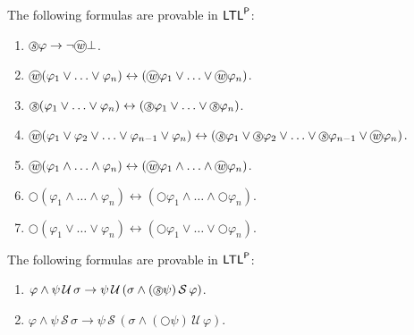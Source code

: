 \documentclass[envcountsect,envcountsame,oribibl,orivec]{llncs}
\newcommand*\circled[1]{\tikz[baseline=(char.base)]{
		\node[shape=circle,draw,inner sep=0.4pt] (char) {#1};}}
\newcommand{\limplies}{\rightarrow}
\newcommand{\lnext}{\bigcirc}
\newcommand{\luntil}{{\,\mathcal{U}\,}}
\newcommand{\lsince}{{\,\mathcal{S}\,}}
\newcommand{\wprevious}{\circled{\textit{w}}}
\newcommand{\sprevious}{\circled{\textit{s}}}
\newcommand{\LTL}{\textsf{LTL}}
\newcommand{\LTLp}{\LTL^{\sf P}}
\renewcommand{\phi}{\varphi}
\begin{document}
\begin{lemma}\label{lem: properties of previous operators}
	The following formulas are provable in $\LTLp$:
	\begin{enumerate}
		\item $\sprevious \phi \rightarrow \neg \wprevious \bot$.
		
		\item $\wprevious(\phi_1 \vee \ldots \vee \phi_n) \leftrightarrow (\wprevious \phi_1 \vee \ldots \vee \wprevious \phi_n)$.
		
		\item $\sprevious(\phi_1 \vee \ldots \vee \phi_n) \leftrightarrow (\sprevious \phi_1 \vee \ldots \vee \sprevious \phi_n)$.
		
		\item $\wprevious(\phi_1 \vee \phi_2 \vee \ldots \vee \phi_{n-1} \vee \phi_n) \leftrightarrow (\sprevious \phi_1 \vee \sprevious \phi_2 \vee\ldots \vee \sprevious \phi_{n-1} \vee \wprevious \phi_n)$.
		
		\item $\wprevious (\phi_1 \wedge \ldots \wedge \phi_n) \leftrightarrow (\wprevious \phi_1 \wedge \ldots \wedge \wprevious \phi_n)$.
		
		\item $\lnext (\phi_1 \wedge \ldots \wedge \phi_n) \leftrightarrow (\lnext \phi_1 \wedge \ldots \wedge \lnext \phi_n)$.
		
		\item  $\lnext (\phi_1 \vee \ldots \vee \phi_n) \leftrightarrow (\lnext \phi_1 \vee  \ldots \vee \lnext \phi_n)$.
	\end{enumerate}

\end{lemma}

\begin{lemma}\label{lem: relationship beetwin since and until}
	The following formulas are provable in $\LTLp$:
	\begin{enumerate}
		\item $\phi \wedge \psi \luntil \sigma \limplies \psi \luntil (\sigma \wedge (\sprevious \psi) \lsince \phi)$.
		
		\item $\phi \wedge \psi \lsince \sigma \limplies \psi \lsince (\sigma \wedge (\lnext \psi) \luntil \phi)$.
		
	\end{enumerate}
	
\end{lemma}
\end{document}
